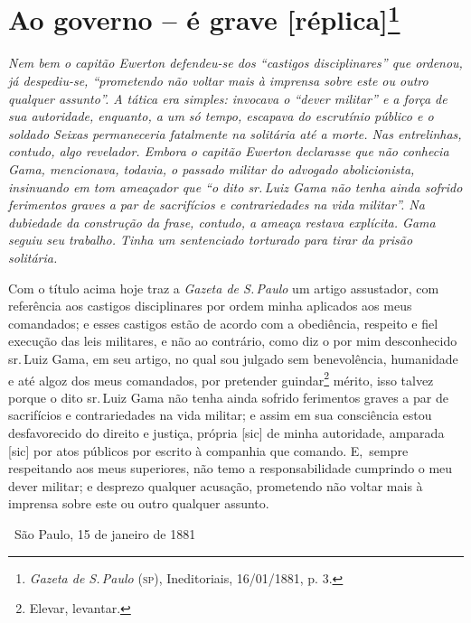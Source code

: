 \pagebreak
\section{Ao governo -- é grave {[}réplica{]}\protect\footnote{\emph{\MakeUppercase{G}azeta de \MakeUppercase{S.\,P}aulo} (\textsc{sp}), \MakeUppercase{I}neditoriais, 16/01/1881, p. 3.}}

\begin{resumo}
\emph{Nem bem o capitão Ewerton defendeu-se dos ``castigos disciplinares''
que ordenou, já despediu-se, ``prometendo não voltar mais à imprensa
sobre este ou outro qualquer assunto''. A tática era simples: invocava o
``dever militar'' e a força de sua autoridade, enquanto, a um só tempo,
escapava do escrutínio público e o soldado Seixas permaneceria
fatalmente na solitária até a morte. Nas entrelinhas, contudo, algo
revelador. Embora o capitão Ewerton declarasse que não conhecia Gama,
mencionava, todavia, o passado militar do advogado abolicionista,
insinuando em tom ameaçador que ``o dito sr.\,Luiz Gama não tenha ainda
sofrido ferimentos graves a par de sacrifícios e contrariedades na vida
militar''. Na dubiedade da construção da frase, contudo, a ameaça restava
explícita. Gama seguiu seu trabalho. Tinha um sentenciado torturado para
tirar da prisão solitária. }
\end{resumo}

Com o título acima hoje traz a \emph{Gazeta de S.\,Paulo} um artigo
assustador, com referência aos castigos disciplinares por ordem minha
aplicados aos meus comandados; e esses castigos estão de acordo com a
obediência, respeito e fiel execução das leis militares, e não ao
contrário, como diz o por mim desconhecido sr.\,Luiz Gama, em seu artigo,
no qual sou julgado sem benevolência, humanidade e até algoz dos meus
comandados, por pretender guindar\footnote{Elevar, levantar.}
mérito, isso talvez porque
o dito sr.\,Luiz Gama não tenha ainda sofrido ferimentos graves a par de
sacrifícios e contrariedades na vida militar; e assim em sua consciência
estou desfavorecido do direito e justiça, própria {[}sic{]} de minha
autoridade, amparada {[}sic{]} por atos públicos por escrito à companhia
que comando. E,~sempre respeitando aos meus superiores, não temo a
responsabilidade cumprindo o meu dever militar; e desprezo qualquer
acusação, prometendo não voltar mais à imprensa sobre este ou outro
qualquer assunto.

\medskip
\hfill\ São Paulo, 15 de janeiro de 1881

